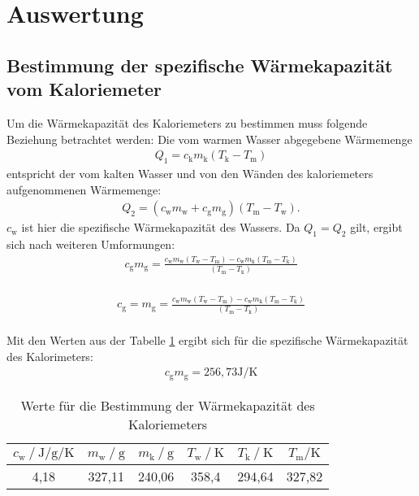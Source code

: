 \section{Auswertung}
\label{sec:Auswertung}
\subsection{Bestimmung der spezifische Wärmekapazität vom Kaloriemeter}
Um die Wärmekapazität des Kaloriemeters zu bestimmen muss folgende Beziehung betrachtet werden:
Die vom warmen Wasser abgegebene Wärmemenge
\begin{align}
Q_\mathrm{1}=c_\mathrm{k} m_\mathrm{k}(T_\mathrm{k}-T_\mathrm{m})
\end{align}
entspricht der vom kalten Wasser und von den Wänden des kaloriemeters aufgenommenen Wärmemenge:
\begin{align}
Q_\mathrm{2}=(c_\mathrm{w} m_\mathrm{w} + c_\mathrm{g} m_\mathrm{g}) (T_\mathrm{m}-T_\mathrm{w}).
\end{align}
$c_\mathrm{w}$ ist hier die spezifische Wärmekapazität des Wassers.
Da $Q_\mathrm {1}=Q_\mathrm{2}$ gilt, ergibt sich nach weiteren Umformungen:
\begin{align}
c_\mathrm{g} m_\mathrm{g}=\frac{c_\mathrm{w} m_\mathrm{w}(T_\mathrm{w}-T_\mathrm{m})-c_\mathrm{w} m_\mathrm{k}(T_\mathrm{m}-T_\mathrm{k})}{(T_\mathrm{m}-T_\mathrm{k})}
\end{align}\\
\begin{align*}
c_\mathrm{g}=
m_\mathrm{g}=\frac{c_\mathrm{w} m_\mathrm{w}(T_\mathrm{w}-T_\mathrm{m})-c_\mathrm{w} m_\mathrm{k}(T_\mathrm{m}-T_\mathrm{k})}{(T_\mathrm{m}-T_\mathrm{k})}
\end{align*}\\
Mit den Werten aus der Tabelle \ref{tab:nullmessung} ergibt sich für die spezifische Wärmekapazität des Kalorimeters:
\begin{align}
  c_\mathrm{g}m_\mathrm{g}=256,73 \si{\joule\per\kelvin}
\end{align}
\begin{table}
  \centering
  \caption{Werte für die Bestimmung der Wärmekapazität des Kaloriemeters}
  \label{tab:nullmessung}
  \begin{tabular}{c c c c c c}
    \toprule
    $c_\mathrm{w}\:/\ \si{\joule\per\gram\per\kelvin}$ & $m_\mathrm{w}\:/\ \si{\gram}$ & $m_\mathrm{k}\:/\ \si{\gram}$ & $T_\mathrm{w}\:/\ \si{\kelvin}$ &  $T_\mathrm{k}\:/\ \si{\kelvin}$ & $T_\mathrm{m}/\si{\kelvin}$  \\
    \midrule
    4,18 & 327,11 & 240,06 & 358,4 & 294,64 & 327,82 \\
    \bottomrule
   \end{tabular}
\end{table}\\


